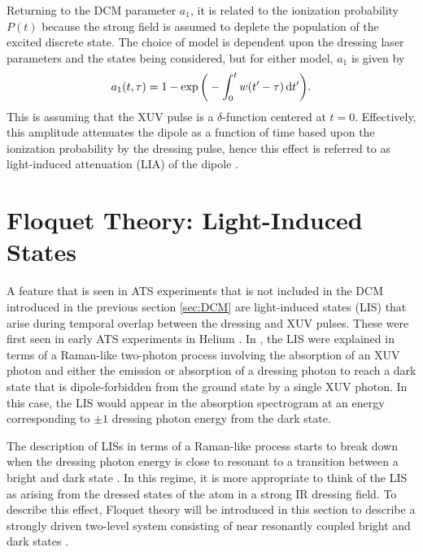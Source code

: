 Returning to the DCM parameter $a_1$, it is related to the ionization probability $P(t)$ because the strong field is assumed to deplete the population of the excited discrete state.  The choice of model is dependent upon the dressing laser parameters and the states being considered, but for either model, $a_1$ is given by 
\begin{equation}
\label{eqn:a1_ion_prob}
	a_1(t,\tau) = 1 - \exp\bigg(-\int_{0}^{t}w(t' - \tau)\mathop{}\!\mathrm{d} t'\bigg).
\end{equation}
This is assuming that the XUV pulse is a $\delta$-function centered at $t=0$.  Effectively, this amplitude attenuates the dipole as a function of time based upon the ionization probability by the dressing pulse, hence this effect is referred to as light-induced attenuation (LIA) of the dipole \cite{chiniSubcycleAcStark2012,chiniCharacterizationApplicationIsolated2012,liaoProbingAutoionizingStates2017}.

\section{Floquet Theory: Light-Induced States}
\label{sec:LIS_Floquet}

A feature that is seen in ATS experiments that is not included in the DCM introduced in the previous section \ref{sec:DCM} are light-induced states (LIS) that arise during temporal overlap between the dressing and XUV pulses.  These were first seen in early ATS experiments in Helium \cite{chenLightinducedStatesAttosecond2012, chiniSubcycleOscillationsVirtual2013}.  In \cite{chenLightinducedStatesAttosecond2012}, the LIS were explained in terms of a Raman-like two-photon process involving the absorption of an XUV photon and either the emission or absorption of a dressing photon to reach a dark state that is dipole-forbidden from the ground state by a single XUV photon. In this case, the LIS would appear in the absorption spectrogram at an energy corresponding to $\pm1$ dressing photon energy from the dark state.

The description of LISs in terms of a Raman-like process starts to break down when the dressing photon energy is close to resonant to a transition between a bright and dark state \cite{wuTheoryStrongfieldAttosecond2016}.  In this regime, it is more appropriate to think of the LIS as arising from the dressed states of the atom in a strong IR dressing field.  To describe this effect, Floquet theory will be introduced in this section to describe a strongly driven two-level system consisting of near resonantly coupled bright and dark states \cite{shirleySolutionSchrOdinger1965,reduzziPolarizationControlAbsorption2015, wuTheoryStrongfieldAttosecond2016}. 

